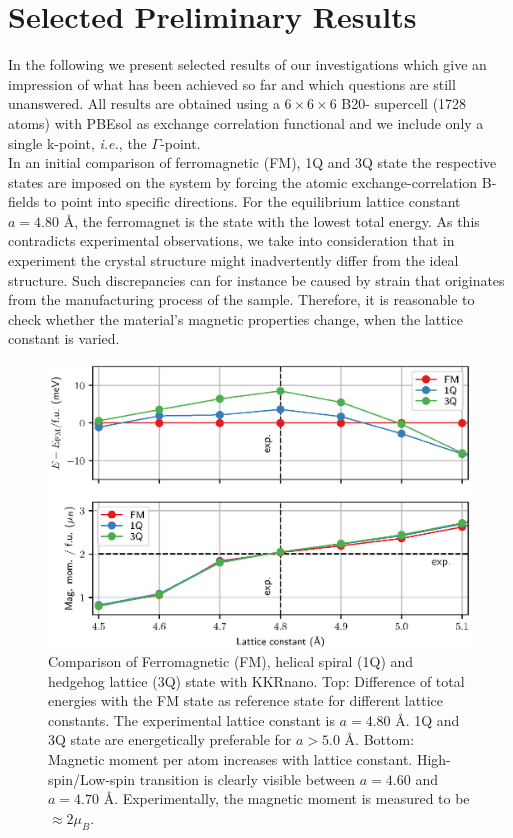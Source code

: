 \documentclass [a4paper, 12pt]{article}
\begin{document}
\section{Selected Preliminary Results}

In the following we present selected results of our investigations which give an impression
of what has been achieved so far and which questions are still unanswered.
All results are obtained using a $6\times 6\times 6$ B20- supercell (1728 atoms) with 
PBEsol as exchange correlation functional
and we include only a single k-point, \textit{i.e.}, the $\Gamma$-point.
\\
In an initial comparison of ferromagnetic (FM), 1Q and 3Q state the respective states are imposed on
the system by forcing the atomic exchange-correlation B-fields
to point into specific directions. 
For the equilibrium lattice constant
$a=4.80$ \AA, the ferromagnet is the state with the lowest total energy.
As this contradicts experimental observations, we take into consideration that
in experiment the crystal structure might inadvertently differ from the ideal structure.
Such discrepancies can for instance be caused by strain that 
originates from the manufacturing process of the sample.
Therefore, it is reasonable to check whether the material's magnetic properties change, when the
lattice constant is varied.
\begin{figure}[htb]
  \centering
   \includegraphics[width=1.00\textwidth]{Figures/MnGe_ferro_1q.eps}
	\caption{Comparison of Ferromagnetic (FM), helical spiral (1Q) and hedgehog lattice (3Q) 
	state with KKRnano.
	Top: Difference of total energies with the FM state as reference state for different
	lattice constants. The experimental lattice constant is $a=4.80$ \AA. 1Q and 3Q state
	are energetically preferable for $a > 5.0$ \AA.
	Bottom: Magnetic moment per  atom increases with lattice constant.
	High-spin/Low-spin transition is clearly visible between $a=4.60$ and $a=4.70$ \AA.
	Experimentally, the magnetic moment is measured to be $\approx 2 \mu_B$.
}
\label{fig:MnGe_kkrnano_comparison}
\end{figure}
\end{document}
